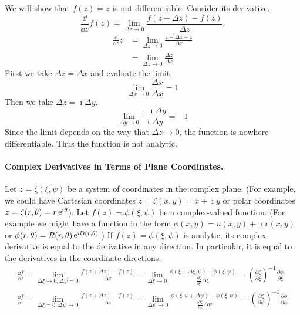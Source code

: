 \begin{Example}
  \label{ex_conj_z}
  We will show that $f(z) = \overline{z}$ is not differentiable.
  Consider its derivative.
  \[
  \frac{\dd}{\dd z} f(z) = \lim_{\Delta z \to 0}\frac{f(z+\Delta z)-f(z)}{\Delta z}.
  \]
  \begin{align*}
    \frac{\dd}{\dd z} \overline{z} 
    &= \lim_{\Delta z \to 0} \frac{\overline{z + \Delta z}-\overline{z}}{\Delta z} 
    \\
    &= \lim_{\Delta z \to 0} \frac{\overline{\Delta z}}{\Delta z} 
  \end{align*}
  First we take $\Delta z = \Delta x$ and evaluate the limit.
  \[ 
  \lim_{\Delta x \to 0} \frac{\Delta x}{\Delta x} = 1
  \]
  Then we take $\Delta z = \imath \Delta y$.
  \[ 
  \lim_{\Delta y \to 0} \frac{-\imath \Delta y}{\imath \Delta y} = -1
  \]
  Since the limit depends on the way that $\Delta z \to 0$, the
  function is nowhere differentiable.  Thus the function is not analytic.
\end{Example}




\paragraph{Complex Derivatives in Terms of Plane Coordinates.}
Let $z = \zeta(\xi, \psi)$ be a system of coordinates in the complex plane.
(For example, we could have Cartesian coordinates $z = \zeta(x, y) = x +
\imath y$ or polar coordinates $z = \zeta(r, \theta) = r \mathop{\mathrm{e}}\nolimits^{\imath \theta}$).  Let $f(z) =
\phi(\xi, \psi)$ be a complex-valued function.  (For example we might have a
function in the form $\phi(x, y) = u(x,y) + \imath v(x,y)$ or $\phi(r,\theta) =
R(r, \theta)  \mathop{\mathrm{e}}\nolimits^{\imath \Theta(r,\theta)}$.)  If $f(z) = \phi(\xi,\psi)$ is analytic, its
complex derivative is equal to the derivative in any direction.  In 
particular, it is equal to the derivatives in the coordinate
directions.
\begin{gather*}
  \frac{\dd f}{\dd z} = 
  \lim_{\Delta \xi \to 0, \Delta \psi = 0} \frac{f(z+\Delta z) - f(z)}{\Delta z}
  = \lim_{\Delta \xi \to 0} 
  \frac{ \phi(\xi + \Delta \xi, \psi) - \phi(\xi, \psi)}
  {\frac{\partial \zeta}{\partial \xi} \Delta \xi} 
  = \left( \frac{\partial \zeta}{\partial \xi} \right)^{-1} \frac{\partial \phi}{\partial \xi}
  \\
  \frac{\dd f}{\dd z} = 
  \lim_{\Delta \xi = 0, \Delta \psi \to 0} \frac{f(z+\Delta z) - f(z)}{\Delta z}
  = \lim_{\Delta \psi \to 0} 
  \frac{ \phi(\xi, \psi + \Delta \psi) - \phi(\xi, \psi)}
  {\frac{\partial \zeta}{\partial \psi} \Delta \psi}
  = \left( \frac{\partial \zeta}{\partial \psi} \right)^{-1} \frac{\partial \phi}{\partial \psi}
\end{gather*}






